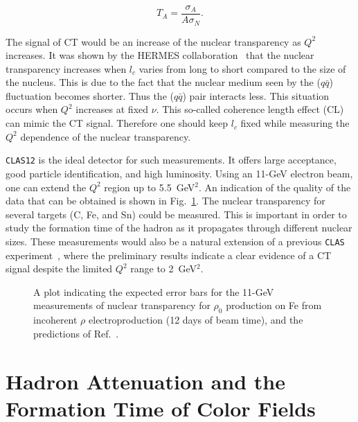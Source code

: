 \begin{equation}
T_A = \frac{\sigma_A}{A\sigma_N}.
\end{equation}

The signal of CT would be an increase of the nuclear transparency as 
$Q^2$ increases.  It was shown by the HERMES collaboration~\cite{acker} 
that the nuclear transparency increases when $l_c$ varies from long to 
short compared to the size of the nucleus.  This is due to the fact that 
the nuclear medium seen by the ($q\bar{q}$) fluctuation becomes shorter. 
Thus the ($q\bar{q}$) pair interacts less.  This situation occurs when 
$Q^2$ increases at fixed $\nu$.  This so-called coherence length effect 
(CL) can mimic the CT signal.  Therefore one should keep $l_c$ fixed while 
measuring the $Q^2$ dependence of the nuclear transparency.

{\tt CLAS12} is the ideal detector for such measurements.  It offers large 
acceptance, good particle identification, and high luminosity. Using 
an 11-GeV electron beam, one can extend the $Q^2$ region up to
5.5~GeV$^2$. An indication of the quality of the data that can be
obtained is shown in Fig.~\ref{res}. 
The nuclear transparency for several targets (C, Fe, and Sn) could be 
measured.  This is important in order to study the formation time of the 
hadron as it propagates through different nuclear sizes.  These 
measurements would also be a natural extension of a previous {\tt CLAS} 
experiment~\cite{koko}, where the preliminary results indicate a clear 
evidence of a CT signal despite the limited $Q^2$ range to 2~GeV$^2$.

\begin{figure}[htbp]
\vspace{9.0cm}
\caption{\small{A plot indicating the expected error bars for the 11-GeV 
measurements of nuclear transparency for $\rho_0$ production on Fe from 
incoherent $\rho$ electroproduction (12 days of beam time), and the 
predictions of Ref.~\cite{kop02}.}}
\label{res}
\end{figure}

\section{Hadron Attenuation and the Formation Time of Color Fields}

